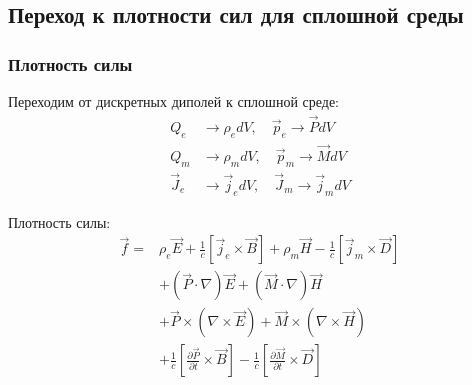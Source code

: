 \documentclass[a4paper,10pt]{article}
\newcommand{\modblock}[1]{\colorbox{modcolor!10}{\parbox{\dimexpr\linewidth-2\fboxsep}{#1}}}
\begin{document}
\modblock{

\subsection{Переход к плотности сил для сплошной среды}

\subsubsection{Плотность силы}

Переходим от дискретных диполей к сплошной среде:
\begin{align}
Q_e &\to \rho_e dV, \quad \vec{p}_e \to \vec{P} dV \\
Q_m &\to \rho_m dV, \quad \vec{p}_m \to \vec{M} dV \\
\vec{J}_e &\to \vec{j}_e dV, \quad \vec{J}_m \to \vec{j}_m dV
\end{align}

Плотность силы:
\begin{equation}
\boxed{
\begin{aligned}
\vec{f} = & \rho_e\vec{E} + \frac{1}{c}[\vec{j}_e\times\vec{B}] + \rho_m\vec{H} - \frac{1}{c}[\vec{j}_m\times\vec{D}] \\
& + (\vec{P}\cdot\nabla)\vec{E} + (\vec{M}\cdot\nabla)\vec{H} \\
& + \vec{P}\times(\nabla\times\vec{E}) + \vec{M}\times(\nabla\times\vec{H}) \\
& + \frac{1}{c}\left[\frac{\partial\vec{P}}{\partial t}\times\vec{B}\right] - \frac{1}{c}\left[\frac{\partial\vec{M}}{\partial t}\times\vec{D}\right]
\end{aligned}
}
\label{eq:force_density_final}
\end{equation}

} %
\end{document}
